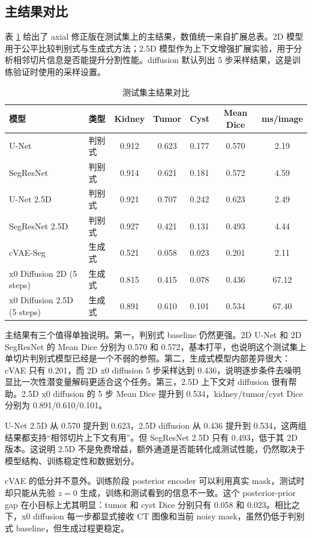 \documentclass[lang=cn,11pt,a4paper]{elegantpaper}
\begin{document}
\subsection{主结果对比}

表 \ref{tab:main_results} 给出了 axial 修正版在测试集上的主结果，数值统一来自扩展总表。2D 模型用于公平比较判别式与生成式方法；2.5D 模型作为上下文增强扩展实验，用于分析相邻切片信息是否能提升分割性能。diffusion 默认列出 5 步采样结果，这是训练验证时使用的采样设置。

\begin{table}[H]
\centering
\caption{测试集主结果对比}
\label{tab:main_results}
\begin{tabular}{llccccc}
\toprule
模型 & 类型 & Kidney & Tumor & Cyst & Mean Dice & ms/image \\
\midrule
U-Net & 判别式 & 0.912 & 0.623 & 0.177 & 0.570 & 2.19 \\
SegResNet & 判别式 & 0.914 & 0.621 & 0.181 & 0.572 & 4.59 \\
U-Net 2.5D & 判别式 & 0.921 & 0.707 & 0.242 & 0.623 & 2.49 \\
SegResNet 2.5D & 判别式 & 0.927 & 0.421 & 0.131 & 0.493 & 4.44 \\
cVAE-Seg & 生成式 & 0.521 & 0.058 & 0.023 & 0.201 & 2.11 \\
x0 Diffusion 2D (5 steps) & 生成式 & 0.815 & 0.415 & 0.078 & 0.436 & 67.12 \\
x0 Diffusion 2.5D (5 steps) & 生成式 & 0.891 & 0.610 & 0.101 & 0.534 & 67.40 \\
\bottomrule
\end{tabular}
\end{table}

主结果有三个值得单独说明。第一，判别式 baseline 仍然更强。2D U-Net 和 2D SegResNet 的 Mean Dice 分别为 0.570 和 0.572，基本打平，也说明这个测试集上单切片判别式模型已经是一个不弱的参照。第二，生成式模型内部差异很大：cVAE 只有 0.201，而 2D x0 diffusion 5 步采样达到 0.436，说明逐步条件去噪明显比一次性潜变量解码更适合这个任务。第三，2.5D 上下文对 diffusion 很有帮助。2.5D x0 diffusion 的 5 步 Mean Dice 提升到 0.534，kidney/tumor/cyst Dice 分别为 0.891/0.610/0.101。

U-Net 2.5D 从 0.570 提升到 0.623，2.5D diffusion 从 0.436 提升到 0.534，这两组结果都支持“相邻切片上下文有用”。但 SegResNet 2.5D 只有 0.493，低于其 2D 版本。这说明 2.5D 不是免费增益，额外通道是否能转化成测试性能，仍然取决于模型结构、训练稳定性和数据划分。

cVAE 的低分并不意外。训练阶段 posterior encoder 可以利用真实 mask，测试时却只能从先验 $z=0$ 生成，训练和测试看到的信息不一致。这个 posterior-prior gap 在小目标上尤其明显：tumor 和 cyst Dice 分别只有 0.058 和 0.023。相比之下，x0 diffusion 每一步都显式接收 CT 图像和当前 noisy mask，虽然仍低于判别式 baseline，但生成过程更稳定。
\end{document}
